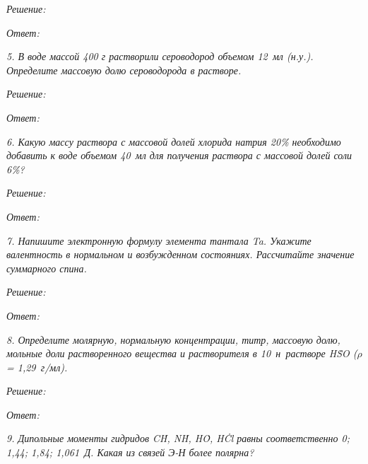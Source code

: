 \vspace*{2em}
\emph{Решение:}

\vspace*{2em}
\emph{Ответ: }

\newpage %

\emph{5. В воде массой 400 г растворили сероводород объемом 12~мл (н.у.).
Определите массовую долю сероводорода в растворе.}

\vspace*{2em}
\emph{Решение:}

\vspace*{2em}
\emph{Ответ: }

\newpage %

\emph{6. Какую массу раствора с массовой долей хлорида натрия 20\% необходимо
добавить к воде объемом 40~мл для получения раствора с массовой долей соли 6\%?}

\vspace*{2em}
\emph{Решение:}

\vspace*{2em}
\emph{Ответ: }

\newpage %

\emph{7. Напишите электронную формулу элемента тантала Ta. Укажите валентность
в нормальном и возбужденном состояниях. Рассчитайте значение суммарного спина.}

\vspace*{2em}
\emph{Решение:}

\vspace*{2em}
\emph{Ответ: }

\newpage %

\emph{8. Определите молярную, нормальную концентрации, титр, массовую долю,
мольные доли растворенного вещества и растворителя в 10~н~растворе
H\.SO (\( \rho \) = 1,29~г/мл).}

\vspace*{2em}
\emph{Решение:}

\vspace*{2em}
\emph{Ответ: }

\newpage %

\emph{9. Дипольные моменты гидридов C\.H, N\.H, H\.O, H\.Cl
равны соответственно 0; 1,44; 1,84; 1,061~Д. Какая из связей Э-Н более полярна?}

